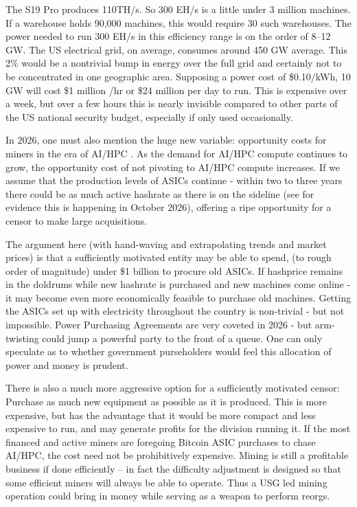 \documentclass{article}%
\begin{document}
The S19 Pro produces 110TH/s.  So 300 EH/s is a little under 3 million
machines.  If a warehouse holds 90,000 machines, this would require 30 such
warehouses.  The power needed to run 300 EH/s in this efficiency range is on
the order of 8--12 GW.  The US electrical grid, on average, consumes around
450 GW average.  This 2\% would be a nontrivial bump in energy over the full
grid and certainly not to be concentrated in one geographic
area.  Supposing a power cost of \$0.10/kWh, 10 GW will cost \$1 million
/hr or \$24 million per day to run.  This is expensive over a week, but
over a few hours this is nearly invisible compared to other
parts of the US national security budget, especially if only used occasionally.



In 2026, one must also mention the huge new variable: opportunity costs for miners
in the era of AI/HPC \cite{TEM2026unplug}.  As the demand for AI/HPC compute continues to grow, the opportunity cost of not pivoting to AI/HPC compute increases.  If we assume that the production levels of ASICs continue - within two to three years there could 
be as much active hashrate as there is on the sideline (see \cite{Zhao2026greatunplug} for evidence this is happening in October 2026), offering a ripe
opportunity for a censor to make large acquisitions.

The argument here (with hand-waving and extrapolating trends and market prices) is that a sufficiently motivated entity may be able to spend, (to rough order of magnitude)  under \$1 billion to procure old ASICs.    If hashprice remains in the doldrums while new hashrate is purchased and new
machines come online - it may become even more economically feasible to purchase
old machines.  Getting the ASICs set up with electricity throughout
the country is non-trivial - but not impossible.  Power Purchasing Agreements are very coveted in 2026 - but arm-twisting could jump a powerful party to the front of a queue. One can only speculate as to whether government purseholders would
feel this allocation of power and money is prudent.

There is also a much more aggressive option for a sufficiently motivated censor:  Purchase as much new equipment as possible as it is produced.  This
is more expensive, but has the advantage that it would be more compact and
less expensive to run, and may generate profits for the division running
it.  If the most financed and active miners are foregoing Bitcoin ASIC
purchases to chase AI/HPC, the cost need not be prohibitively expensive.
 Mining is still a profitable business if done efficiently -- in fact the
difficulty adjustment is designed so that some efficient miners will always be able
to operate.  Thus a USG led mining operation could bring in money while
serving as a weapon to perform reorgs.
\end{document}
